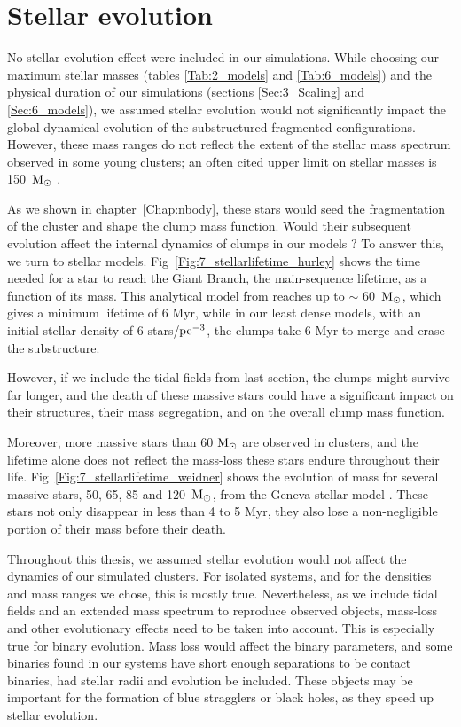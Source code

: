 \section{Stellar evolution}





No stellar evolution effect were included in our simulations. While choosing our maximum stellar masses (tables \ref{Tab:2_models} and \ref{Tab:6_models}) and the physical duration of our simulations (sections \ref{Sec:3_Scaling} and \ref{Sec:6_models}), we assumed stellar evolution would not significantly impact the global dynamical evolution of the substructured fragmented configurations. However, these mass ranges do not reflect the extent of the stellar mass spectrum observed in some young clusters; an often cited upper limit on stellar masses is 150~${\textrm{M}_\odot}$ \citep{Oey2005}.

As we shown in chapter~\ref{Chap:nbody}, these stars would seed the fragmentation of the cluster and shape the clump mass function. Would their subsequent evolution affect the internal dynamics of clumps in our models ? To answer this, we turn to stellar models. Fig~\ref{Fig:7_stellarlifetime_hurley} shows the time needed for a star to reach the Giant Branch, the main-sequence lifetime, as a function of its mass. This analytical model from \cite{Hurley2000} reaches up to $\sim$ 60~${\textrm{M}_\odot}$, which gives a minimum lifetime of 6 Myr, while in our least dense models, with an initial stellar density of 6 stars/${\textrm{pc}}^{-3}$, the clumps take 6 Myr to merge and erase the substructure.

However, if we include the tidal fields from last section, the clumps might survive far longer, and the death of these massive stars could have a significant impact on their structures, their mass segregation, and  on the overall clump mass function.

Moreover, more massive stars than 60 ${\textrm{M}_\odot}$ are observed in clusters, and the lifetime alone does not reflect the mass-loss these stars endure throughout their life. Fig~\ref{Fig:7_stellarlifetime_weidner} shows the evolution of mass for several massive stars, 50, 65, 85 and 120~${\textrm{M}_\odot}$, from the Geneva stellar model \citep{Schaller1992}. These stars not only disappear in less than 4 to 5 Myr, they also lose a non-negligible portion of their mass before their death.

Throughout this thesis, we assumed stellar evolution would not affect the dynamics of our simulated clusters. For isolated systems, and for the densities and mass ranges we chose, this is mostly true. Nevertheless, as we include tidal fields and an extended mass spectrum to reproduce observed objects, mass-loss and other evolutionary effects need to be taken into account. This is especially true for binary evolution. Mass loss would affect the binary parameters, and some binaries found in our systems have short enough separations to be contact binaries, had stellar radii and evolution be included. These objects may be important for the formation of blue stragglers or black holes, as they speed up stellar evolution.


